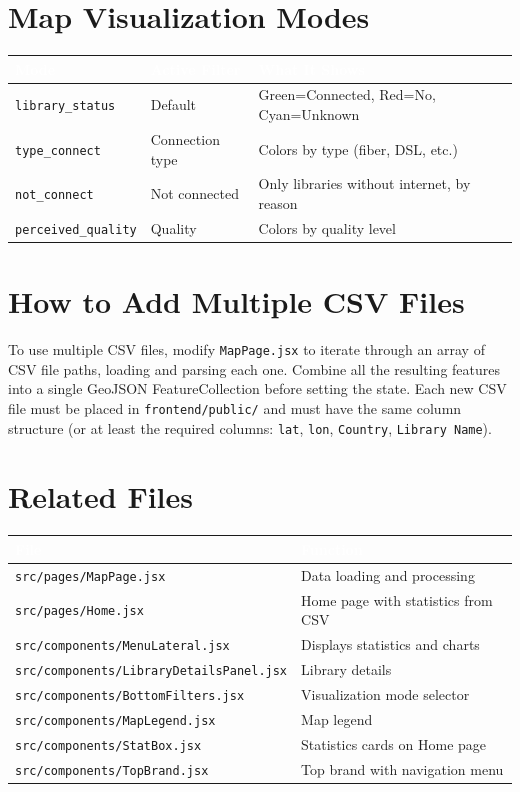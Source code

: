 \documentclass[11pt,a4paper]{article}
\begin{document}
\section{Map Visualization Modes}

\begin{longtable}{|p{4cm}|p{3cm}|p{6cm}|}
\hline
\rowcolor{headerblue}\textcolor{white}{\textbf{Mode}} & \textcolor{white}{\textbf{Active Filter}} & \textcolor{white}{\textbf{What It Shows}} \\
\hline
\texttt{library\_status} & Default & Green=Connected, Red=No, Cyan=Unknown \\
\hline
\texttt{type\_connect} & Connection type & Colors by type (fiber, DSL, etc.) \\
\hline
\texttt{not\_connect} & Not connected & Only libraries without internet, by reason \\
\hline
\texttt{perceived\_quality} & Quality & Colors by quality level \\
\hline
\end{longtable}

\section{How to Add Multiple CSV Files}

To use multiple CSV files, modify \texttt{MapPage.jsx} to iterate through an array of CSV file paths, loading and parsing each one. Combine all the resulting features into a single GeoJSON FeatureCollection before setting the state. Each new CSV file must be placed in \texttt{frontend/public/} and must have the same column structure (or at least the required columns: \texttt{lat}, \texttt{lon}, \texttt{Country}, \texttt{Library Name}).

\section{Related Files}

\begin{longtable}{|p{7.5cm}|p{6.5cm}|}
\hline
\rowcolor{headerblue}\textcolor{white}{\textbf{File}} & \textcolor{white}{\textbf{Function}} \\
\hline
\texttt{src/pages/MapPage.jsx} & Data loading and processing \\
\hline
\texttt{src/pages/Home.jsx} & Home page with statistics from CSV \\
\hline
\texttt{src/components/MenuLateral.jsx} & Displays statistics and charts \\
\hline
\texttt{src/components/LibraryDetailsPanel.jsx} & Library details \\
\hline
\texttt{src/components/BottomFilters.jsx} & Visualization mode selector \\
\hline
\texttt{src/components/MapLegend.jsx} & Map legend \\
\hline
\texttt{src/components/StatBox.jsx} & Statistics cards on Home page \\
\hline
\texttt{src/components/TopBrand.jsx} & Top brand with navigation menu \\
\hline
\end{longtable}
\end{document}
